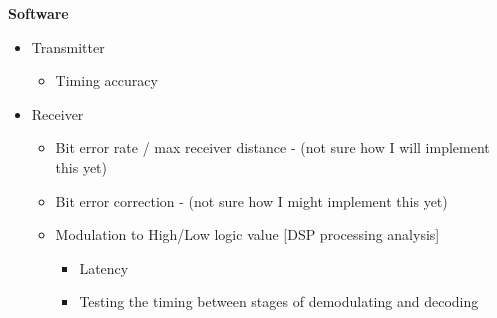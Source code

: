 \textbf{Software}
\begin{itemize}
	
	\item Transmitter
	\begin{itemize}
		\item Timing accuracy
	\end{itemize}
	
	
	\item Receiver
	\begin{itemize}
		\item Bit error rate / max receiver distance - (not sure how I will implement this yet)
		\item Bit error correction - (not sure how I might implement this yet)
		\item Modulation to High/Low logic value [DSP processing analysis]
		\begin{itemize}
			\item Latency
			\item Testing the timing between stages of demodulating and decoding
		\end{itemize}
	\end{itemize}
	
\end{itemize}